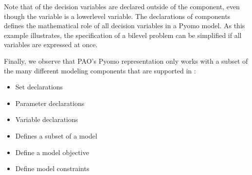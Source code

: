 \documentclass[letterpaper,10pt,english]{sphinxmanual}
\begin{document}
\begin{sphinxVerbatim}[commandchars=\\\{\}]
  
  
  
\end{sphinxVerbatim}

Note that  of the decision variables are declared outside of the
{\hyperref[\detokenize{reference/pyomo:pao.pyomo.components.SubModel}]{}} component, even though the variable  is a
lower\sphinxhyphen{}level variable.  The declarations of {\hyperref[\detokenize{reference/pyomo:pao.pyomo.components.SubModel}]{}} components
defines the mathematical role of all decision variables in a Pyomo model.
As this example illustrates, the specification of a bilevel problem can
be simplified if all variables are expressed at once.

Finally, we observe that PAO’s Pyomo representation only works with a
subset of the many different modeling components that are supported in
:
\begin{itemize}
\item {} 
 \sphinxhyphen{} Set declarations

\item {} 
 \sphinxhyphen{} Parameter declarations

\item {} 
 \sphinxhyphen{} Variable declarations

\item {} 
 \sphinxhyphen{} Defines a subset of a model

\item {} 
 \sphinxhyphen{} Define a model objective

\item {} 
 \sphinxhyphen{} Define model constraints

\end{itemize}
\end{document}
